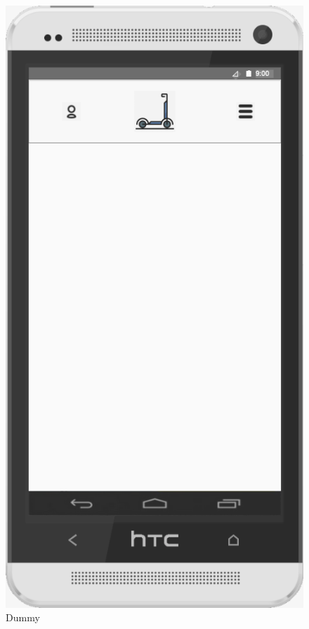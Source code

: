 \documentclass[a4paper, 12pt]{article}
\begin{document}
\begin{figure} [htbp]
  \begin{center}
    \includegraphics[scale=0.5]{images/prototypes/01-dummy.png}
  \end{center}
  \caption{Dummy}
\end{figure}
\end{document}
